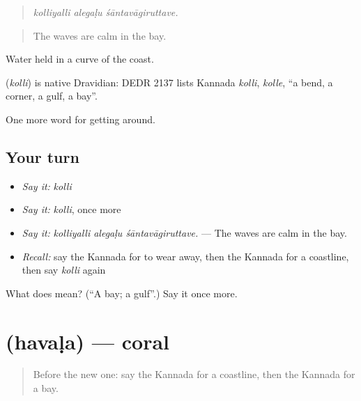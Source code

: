 \begin{quote}
\emph{kolliyalli alegaḷu śāntavāgiruttave.}
\end{quote}

\begin{quote}
The waves are calm in the bay.
\end{quote}

Water held in a curve of the coast.

\begin{cousinweb}
\textbf{} (\emph{kolli}) is native Dravidian: DEDR 2137 lists Kannada \emph{kolli}, \emph{kolle}, \textquotedblleft{}a bend, a corner, a gulf, a bay\textquotedblright{}.
\end{cousinweb}

\begin{grammarlens}[title={What you've built}]
One more word for getting around.
\end{grammarlens}

\subsection*{Your turn}
\begin{itemize}
\raggedright
  \item \emph{Say it:} \emph{kolli}
  \item \emph{Say it:} \emph{kolli}, once more
  \item \emph{Say it:} \emph{kolliyalli alegaḷu śāntavāgiruttave.} — The waves are calm in the bay.
  \item \emph{Recall:} say the Kannada for to wear away, then the Kannada for a coastline, then say \emph{kolli} again
\end{itemize}

\begin{tcolorbox}[breakable,colback=teal!4,colframe=teal!35!black,title={Before you move on}]
What does  mean? (\textquotedblleft{}A bay; a gulf\textquotedblright{}.) Say it once more.
\end{tcolorbox}
\section[\texorpdfstring{\kn{ಹವಳ} (havaḷa)}{ಹವಳ (havaḷa)}]{ (havaḷa) — coral}

\label{lesson:KA-C481-havala}



\begin{quote}
Before the new one: say the Kannada for a coastline, then the Kannada for a bay.
\end{quote}

